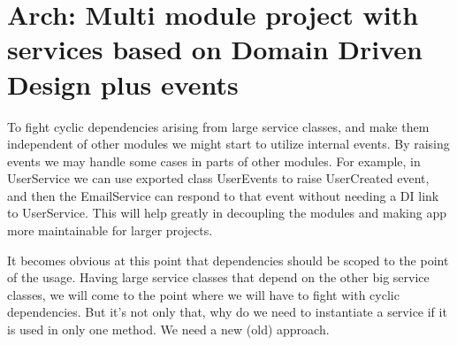 \section{Arch: Multi module project with services based on Domain Driven Design plus events}\label{sec:arch-mm-ddd-events}

To fight cyclic dependencies arising from large service classes, and make them independent of other modules we might
start to utilize internal events.
By raising events we may handle some cases in parts of other modules.
For example, in UserService we can use exported class UserEvents to raise UserCreated event, and then the
EmailService can respond to that event without needing a DI link to UserService.
This will help greatly in decoupling the modules and making app more maintainable for larger projects.

\begin{tcolorbox}[title=Dependency Injection issues]
  It becomes obvious at this point that dependencies should be scoped to the point of the usage.
  Having large service classes that depend on the other big service classes, we will come to the point where we
  will have to fight with cyclic dependencies.
  But it's not only that, why do we need to instantiate a service if it is used in only one method.
  We need a new (old) approach.
\end{tcolorbox}


